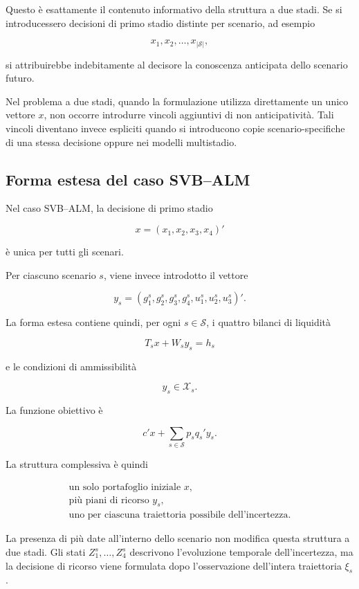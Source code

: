Questo \`e esattamente il contenuto informativo della struttura a due
stadi. Se si introducessero decisioni di primo stadio distinte per
scenario, ad esempio

\[
x_1,x_2,\ldots,x_{|\mathcal S|},
\]

\noindent si attribuirebbe indebitamente al decisore la conoscenza anticipata
dello scenario futuro.

\begin{remark}
Nel problema a due stadi, quando la formulazione utilizza direttamente
un unico vettore $x$, non occorre introdurre vincoli aggiuntivi di non
anticipativit\`a. Tali vincoli diventano invece espliciti quando si
introducono copie scenario-specifiche di una stessa decisione oppure nei
modelli multistadio.
\end{remark}

\subsection{Forma estesa del caso SVB--ALM}

Nel caso SVB--ALM, la decisione di primo stadio

\[
x=(x_1,x_2,x_3,x_4)'
\]

\noindent \`e unica per tutti gli scenari.

Per ciascuno scenario $s$, viene invece introdotto il vettore

\[
y_s=
(g_1^s,g_2^s,g_3^s,g_4^s,
u_1^s,u_2^s,u_3^s)'.
\]

La forma estesa contiene quindi, per ogni $s\in\mathcal S$, i quattro
bilanci di liquidit\`a

\[
T_sx+W_sy_s=h_s
\]

e le condizioni di ammissibilit\`a

\[
y_s\in\mathcal X_s.
\]

La funzione obiettivo \`e

\[
c'x+\sum_{s\in\mathcal S}p_s q_s'y_s.
\]

La struttura complessiva \`e quindi

\[
\begin{array}{c}
\text{un solo portafoglio iniziale }x,
\\[0.2cm]
\text{pi\`u piani di ricorso }y_s,
\\[0.2cm]
\text{uno per ciascuna traiettoria possibile dell'incertezza.}
\end{array}
\]

La presenza di pi\`u date all'interno dello scenario non modifica questa
struttura a due stadi. Gli stati $Z_1^s,\ldots,Z_4^s$ descrivono
l'evoluzione temporale dell'incertezza, ma la decisione di ricorso viene
formulata dopo l'osservazione dell'intera traiettoria $\xi_s$.

